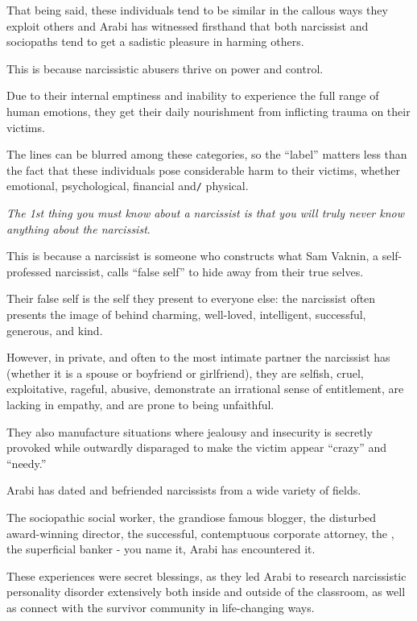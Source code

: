 \documentclass[oneside]{book}
\numberwithin{equation}{section}
\begin{document}
That being said, these individuals tend to be similar in the callous ways they exploit others and Arabi has witnessed firsthand that both narcissist and sociopaths tend to get a sadistic pleasure in harming others.

This is because narcissistic abusers thrive on power and control.

Due to their internal emptiness and inability to experience the full range of human emotions, they get their daily nourishment from inflicting trauma on their victims.

The lines can be blurred among these categories, so the ``label'' matters less than the fact that these individuals pose considerable harm to their victims, whether emotional, psychological, financial and\texttt{/} physical.

%
\textit{The 1st thing you must know about a narcissist is that you will truly never know anything about the narcissist}.

This is because a narcissist is someone who constructs what Sam Vaknin, a self-professed narcissist, calls ``false self'' to hide away from their true selves.

Their false self is the self they present to everyone else: the narcissist often presents the image of behind charming, well-loved, intelligent, successful, generous, and kind.

However, in private, and often to the most intimate partner the narcissist has (whether it is a spouse or boyfriend or girlfriend), they are selfish, cruel, exploitative, rageful, abusive, demonstrate an irrational sense of entitlement, are lacking in empathy, and are prone to being unfaithful.

They also manufacture situations where jealousy and insecurity is secretly provoked while outwardly disparaged to make the victim appear ``crazy'' and ``needy.''

%
Arabi has dated and befriended narcissists from a wide variety of fields.

The sociopathic social worker, the grandiose famous blogger, the disturbed award-winning director, the successful, contemptuous corporate attorney, the , the superficial banker - you name it, Arabi has encountered it.

These experiences were secret blessings, as they led Arabi to research narcissistic personality disorder extensively both inside and outside of the classroom, as well as connect with the survivor community in life-changing ways.
\end{document}
